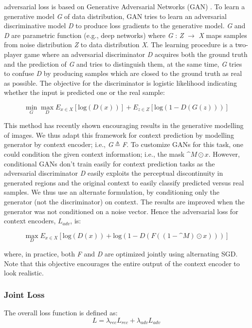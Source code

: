 adversarial loss is based on Generative Adversarial Networks (GAN) \cite{NIPS2014_5ca3e9b1}. To learn a generative model \emph{G} of data distribution, GAN tries to learn an adversarial discriminative model \emph{D} to produce loss gradients to the generative model. \emph{G} and \emph{D} are parametric function (e.g., deep networks) where \emph{G} : \emph{Z} $\rightarrow$ \emph{X} maps samples from noise distribution \emph{Z} to data distribution \emph{X}. The learning procedure is a two-player game where an adversarial discriminator \emph{D} acquires both the ground truth and the prediction of \emph{G} and tries to distinguish them, at the same time, \emph{G} tries to confuse \emph{D} by producing samples which are closed to the ground truth as real as possible. The objective for the discriminator is logistic likelihood indicating whether the input is predicted one or the real sample:

\begin{equation}
    \mathop{min}\limits_{G}\mathop{max}\limits_{D} E_{x\in X}[\text{log}(D(x))]+ E_{z \in Z}[\text{log}(1-D(G(z)))]
\end{equation}

This method has recently shown encouraging results in the generative modelling of images. We thus adapt this framework for context prediction by modelling generator by context encoder; i.e., \emph{G}$\triangleq$\emph{F}.  To customize GANs for this task, one could condition the given context information; i.e., the mask $\^{M}\odot x$. However, conditional GANs don’t train easily for context prediction tasks as the adversarial discriminator \emph{D} easily exploits the perceptual discontinuity in generated regions and the original context to easily classify predicted versus real samples. We thus use an alternate formulation, by conditioning only the generator (not the discriminator) on context. The results are improved when the generator was not conditioned on a noise vector. Hence the adversarial loss for context encoders, $L_{adv}$, is:

\begin{equation}
    \mathop{max}\limits_{D}E_{x\in X}[\text{log}(D(x))+\text{log}(1-D(F((1-\^{M})\textstyle\odot x)))]
\end{equation}

where, in practice, both \emph{F} and \emph{D} are optimized jointly using alternating SGD. Note that this objective encourages the entire output of the context encoder to look realistic.
\subsubsection{Joint Loss}
The overall loss function is defined as:
\begin{equation}
    L=\lambda_{rec}L_{rec}+\lambda_{adv}L_{adv}
\end{equation}
